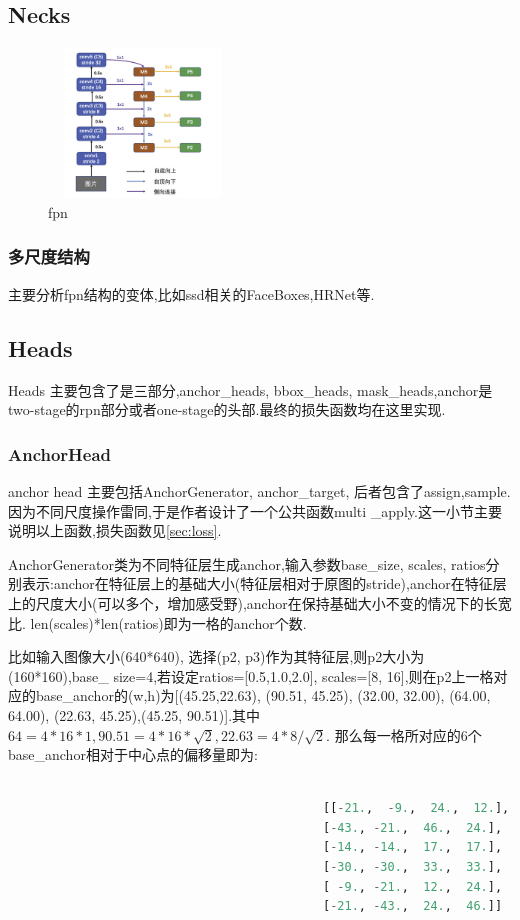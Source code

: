 \documentclass[UTF8]{ctexart}
\begin{document}
\subsection{Necks}
\begin{figure}[htbp]
	\centering
	\includegraphics[width=5cm,height=4cm]{./pic/fpn.png}
	\caption{fpn}
	\label{picfpn}
\end{figure}

\subsubsection{多尺度结构}
主要分析fpn结构的变体,比如ssd相关的FaceBoxes,HRNet等.


\subsection{Heads}
Heads 主要包含了是三部分,anchor\_heads, bbox\_heads, mask\_heads,anchor是two-stage的rpn部分或者one-stage的头部.最终的损失函数均在这里实现.

\subsubsection{AnchorHead}
\label{sub:anchorhead}
anchor head 主要包括AnchorGenerator, anchor\_target, 后者包含了assign,sample.因为不同尺度操作雷同,于是作者设计了一个公共函数multi
\_apply.这一小节主要说明以上函数,损失函数见\ref{sec:loss}.

AnchorGenerator类为不同特征层生成anchor,输入参数base\_size, scales, ratios分别表示:anchor在特征层上的基础大小(特征层相对于原图的stride),anchor在特征层上的尺度大小(可以多个，增加感受野),anchor在保持基础大小不变的情况下的长宽比.
len(scales)*len(ratios)即为一格的anchor个数.

比如输入图像大小(640*640), 选择(p2, p3)作为其特征层,则p2大小为(160*160),base\_ size=4,若设定ratios=[0.5,1.0,2.0], scales=[8, 16],则在p2上一格对应的base\_anchor的(w,h)为[(45.25,22.63),  (90.51, 45.25),
 (32.00, 32.00),  (64.00, 64.00), (22.63, 45.25),(45.25, 90.51)].其中$64=4*16*1,90.51=4*16*\sqrt{2}, 22.63=4*8/\sqrt{2}.$
 那么每一格所对应的6个base\_anchor相对于中心点的偏移量即为:
\lstset{style=mystyle}
\begin{lstlisting}[language=Python]
	
											[[-21.,  -9.,  24.,  12.],
											[-43., -21.,  46.,  24.],
											[-14., -14.,  17.,  17.],
											[-30., -30.,  33.,  33.],
											[ -9., -21.,  12.,  24.],
											[-21., -43.,  24.,  46.]]

\end{lstlisting}
\end{document}
